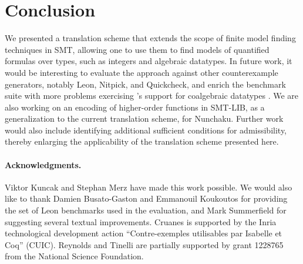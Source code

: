 \section{Conclusion}
\label{sec:conclusion}

We presented a translation scheme that extends the scope of finite model finding
techniques in SMT, allowing one to use them to find models of quantified formulas
over  types, such as integers and algebraic datatypes.
%
In future work, it would be interesting to evaluate the approach against other
counterexample generators, notably Leon, Nitpick, and Quickcheck,
and enrich the benchmark suite with more problems exercising \cvc's support for
coalgebraic datatypes \cite{reynolds-blanchette-2015-codata}.
We are also working on an encoding of higher-order functions in SMT-LIB, as a
generalization to the current translation scheme, for Nunchaku. Further work
would also include identifying additional sufficient conditions for
admissibility, thereby enlarging the applicability of the translation scheme
presented here.


{\footnotesize

\def\ackname{Acknowledgments}
\paragraph{\footnotesize
\ackname.}
Viktor Kuncak and Stephan Merz have made this work possible. We would also like
to thank Damien Busato-Gaston and Emmanouil Koukoutos for providing the
set of Leon benchmarks used in the evaluation, 
and
Mark Summerfield for suggesting
several textual improvements. %
Cruanes is supported by the Inria technological
development action ``Contre-exemples utilisables par Isabelle et Coq'' (CUIC).
Reynolds and Tinelli are partially supported by grant 1228765 from the National Science Foundation.
}
%

{


}


